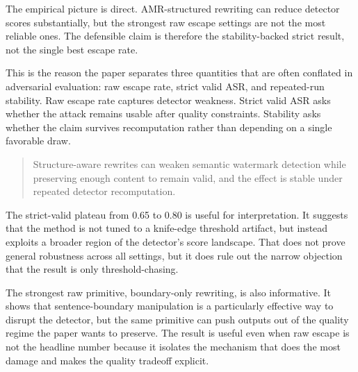 The empirical picture is direct. AMR-structured rewriting can reduce detector scores substantially, but the strongest raw escape settings are not the most reliable ones. The defensible claim is therefore the stability-backed strict result, not the single best escape rate.

This is the reason the paper separates three quantities that are often conflated in adversarial evaluation: raw escape rate, strict valid ASR, and repeated-run stability. Raw escape rate captures detector weakness. Strict valid ASR asks whether the attack remains usable after quality constraints. Stability asks whether the claim survives recomputation rather than depending on a single favorable draw.

\begin{quote}
Structure-aware rewrites can weaken semantic watermark detection while preserving enough content to remain valid, and the effect is stable under repeated detector recomputation.
\end{quote}

The strict-valid plateau from 0.65 to 0.80 is useful for interpretation. It suggests that the method is not tuned to a knife-edge threshold artifact, but instead exploits a broader region of the detector's score landscape. That does not prove general robustness across all settings, but it does rule out the narrow objection that the result is only threshold-chasing.

The strongest raw primitive, boundary-only rewriting, is also informative. It shows that sentence-boundary manipulation is a particularly effective way to disrupt the detector, but the same primitive can push outputs out of the quality regime the paper wants to preserve. The result is useful even when raw escape is not the headline number because it isolates the mechanism that does the most damage and makes the quality tradeoff explicit.
